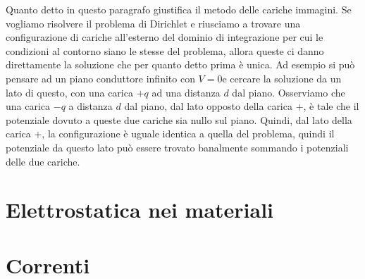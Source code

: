 \documentclass{article}
\numberwithin{equation}{section}
\begin{document}
Quanto detto in questo paragrafo giustifica il metodo delle cariche immagini. Se vogliamo risolvere il problema di Dirichlet e riusciamo a trovare una configurazione di cariche all'esterno del dominio di integrazione per cui le condizioni al contorno siano le stesse del problema, allora queste ci danno direttamente la soluzione che per quanto detto prima è unica. Ad esempio si può pensare ad un piano conduttore infinito con $V=0$e cercare la soluzione da un lato di questo, con una carica $+q$ ad una distanza $d$ dal piano. Osserviamo che una carica $-q$ a distanza $d$ dal piano, dal lato opposto della carica +, è tale che il potenziale dovuto a queste due cariche sia nullo sul piano. Quindi, dal lato della carica +, la configurazione è uguale identica a quella del problema, quindi il potenziale da questo lato può essere trovato banalmente sommando i potenziali delle due cariche.



\section{Elettrostatica nei materiali} %
\label{sec:elettrostatica_nei_materiali}


\section{Correnti} %
\label{sec:correnti}

\end{document}
